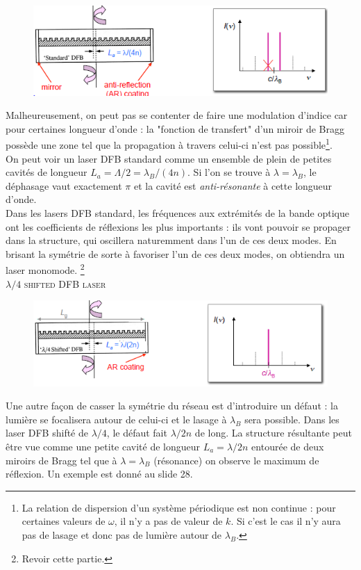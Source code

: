 	\begin{figure}
	\vspace{-5mm}
	\includegraphics[scale=0.6]{ch4/image18}
	\end{figure}
Malheureusement, on peut pas se contenter de faire une modulation d'indice car pour certaines longueur
d'onde : la "fonction de transfert" d'un miroir de Bragg possède une zone tel que la propagation à
travers celui-ci n'est pas possible\footnote{La relation de dispersion d'un système périodique 
est non continue : pour certaines valeurs de $\omega$, il n'y a pas de valeur de $k$. Si c'est le
cas il n'y aura pas de lasage et donc pas de lumière autour de $\lambda_B$.}. \\


On peut voir un laser DFB standard comme un ensemble de plein de petites cavités de longueur $L_a = \Lambda/2 = \lambda_B/(4n)$. Si l'on se trouve à $\lambda=\lambda_B$, le déphasage vaut exactement
$\pi$ et la cavité est \textit{anti-résonante} à cette longueur d'onde.\\

Dans les lasers DFB standard, les fréquences aux extrémités de la bande optique ont les coefficients
de réflexions les plus importants : ils vont pouvoir se propager dans la structure, qui oscillera 
naturemment dans l'un de ces deux modes. En brisant la symétrie de sorte à favoriser l'un de ces
deux modes, on obtiendra un laser monomode. \footnote{Revoir cette partie.}\\





\textsc{$\lambda/4$ shifted DFB laser}\\
	\begin{figure}
	\vspace{-5mm}
	\includegraphics[scale=0.6]{ch4/image19}
	\end{figure}
Une autre façon de casser la symétrie du réseau est d'introduire un défaut : la lumière se focalisera
autour de celui-ci et le lasage à $\lambda_B$ sera possible. Dans les laser DFB shifté de $\lambda/4$,
le défaut fait $\lambda/2n$ de long. La structure résultante peut être vue comme une petite cavité de
longueur $L_a=\lambda/2n$ entourée de deux miroirs de Bragg tel que à $\lambda=\lambda_B$ (résonance) on
observe le maximum de réflexion. Un exemple est donné au slide 28.


